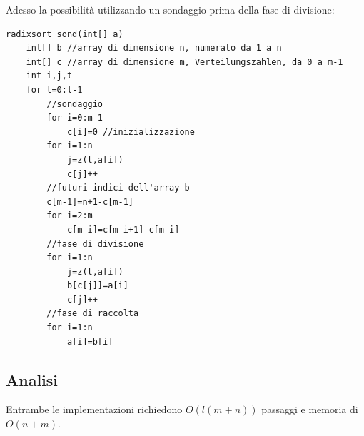 \documentclass[a4paper]{book}
\begin{document}
Adesso la possibilità utilizzando un sondaggio prima della fase di divisione:
\begin{lstlisting}
radixsort_sond(int[] a)
	int[] b //array di dimensione n, numerato da 1 a n
	int[] c //array di dimensione m, Verteilungszahlen, da 0 a m-1
	int i,j,t
	for t=0:l-1
		//sondaggio
		for i=0:m-1
			c[i]=0 //inizializzazione
		for i=1:n
			j=z(t,a[i])
			c[j]++ 
		//futuri indici dell'array b
		c[m-1]=n+1-c[m-1]
		for i=2:m
			c[m-i]=c[m-i+1]-c[m-i]
		//fase di divisione
		for i=1:n
			j=z(t,a[i])
			b[c[j]]=a[i]
			c[j]++
		//fase di raccolta
		for i=1:n
			a[i]=b[i]				
\end{lstlisting}
\subsection*{Analisi}
Entrambe le implementazioni richiedono $O(l(m+n))$ passaggi e memoria di $O(n+m)$.
\end{document}
